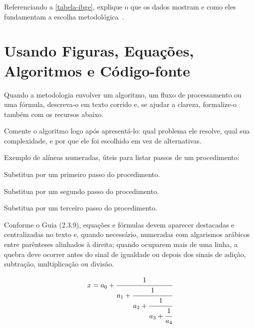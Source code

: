 Referenciando a \autoref{tabela-ibge}, explique o que os dados mostram e como eles fundamentam a escolha metodológica~\cite{Huetal2000}.

\section{Usando Figuras, Equações, Algoritmos e Código-fonte}
\label{sec:exemplo-de-algoritmos-e-figuras}

Quando a metodologia envolver um algoritmo, um fluxo de processamento ou uma fórmula, descreva-o em texto corrido e, se ajudar a clareza, formalize-o também com os recursos abaixo.

\begin{algorithm}[ht!]
	\SetSpacedAlgorithm
	\caption{\label{exemplo-de-algoritmo}Substitua pelo nome do seu algoritmo}
\end{algorithm}

Comente o algoritmo logo após apresentá-lo: qual problema ele resolve, qual sua complexidade, e por que ele foi escolhido em vez de alternativas.

Exemplo de alíneas numeradas, úteis para listar passos de um procedimento:

\begin{alineascomnumero}
	\item Substitua por um primeiro passo do procedimento.
	\item Substitua por um segundo passo do procedimento.
	\item Substitua por um terceiro passo do procedimento.
\end{alineascomnumero}

Conforme o Guia (2.3.9), equações e fórmulas devem aparecer destacadas e centralizadas no texto e, quando necessário, numeradas com algarismos arábicos entre parênteses alinhados à direita; quando ocuparem mais de uma linha, a quebra deve ocorrer antes do sinal de igualdade ou depois dos sinais de adição, subtração, multiplicação ou divisão.

\begin{equation}
	\begin{aligned}
		x = a_0 + \cfrac{1}{a_1
			+ \cfrac{1}{a_2
				+ \cfrac{1}{a_3 + \cfrac{1}{a_4} } } }
	\end{aligned}
\end{equation}


